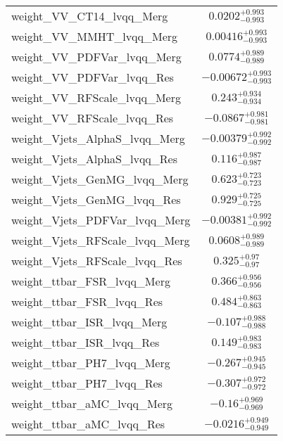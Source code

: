 \begin{tabular}{|l|c|}
weight\_VV\_CT14\_lvqq\_Merg & $0.0202^{+0.993}_{-0.993}$ \\
weight\_VV\_MMHT\_lvqq\_Merg & $0.00416^{+0.993}_{-0.993}$ \\
weight\_VV\_PDFVar\_lvqq\_Merg & $0.0774^{+0.989}_{-0.989}$ \\
weight\_VV\_PDFVar\_lvqq\_Res & $-0.00672^{+0.993}_{-0.993}$ \\
weight\_VV\_RFScale\_lvqq\_Merg & $0.243^{+0.934}_{-0.934}$ \\
weight\_VV\_RFScale\_lvqq\_Res & $-0.0867^{+0.981}_{-0.981}$ \\
weight\_Vjets\_AlphaS\_lvqq\_Merg & $-0.00379^{+0.992}_{-0.992}$ \\
weight\_Vjets\_AlphaS\_lvqq\_Res & $0.116^{+0.987}_{-0.987}$ \\
weight\_Vjets\_GenMG\_lvqq\_Merg & $0.623^{+0.723}_{-0.723}$ \\
weight\_Vjets\_GenMG\_lvqq\_Res & $0.929^{+0.725}_{-0.725}$ \\
weight\_Vjets\_PDFVar\_lvqq\_Merg & $-0.00381^{+0.992}_{-0.992}$ \\
weight\_Vjets\_RFScale\_lvqq\_Merg & $0.0608^{+0.989}_{-0.989}$ \\
weight\_Vjets\_RFScale\_lvqq\_Res & $0.325^{+0.97}_{-0.97}$ \\
weight\_ttbar\_FSR\_lvqq\_Merg & $0.366^{+0.956}_{-0.956}$ \\
weight\_ttbar\_FSR\_lvqq\_Res & $0.484^{+0.863}_{-0.863}$ \\
weight\_ttbar\_ISR\_lvqq\_Merg & $-0.107^{+0.988}_{-0.988}$ \\
weight\_ttbar\_ISR\_lvqq\_Res & $0.149^{+0.983}_{-0.983}$ \\
weight\_ttbar\_PH7\_lvqq\_Merg & $-0.267^{+0.945}_{-0.945}$ \\
weight\_ttbar\_PH7\_lvqq\_Res & $-0.307^{+0.972}_{-0.972}$ \\
weight\_ttbar\_aMC\_lvqq\_Merg & $-0.16^{+0.969}_{-0.969}$ \\
weight\_ttbar\_aMC\_lvqq\_Res & $-0.0216^{+0.949}_{-0.949}$ \\
\hline
\end{tabular}
